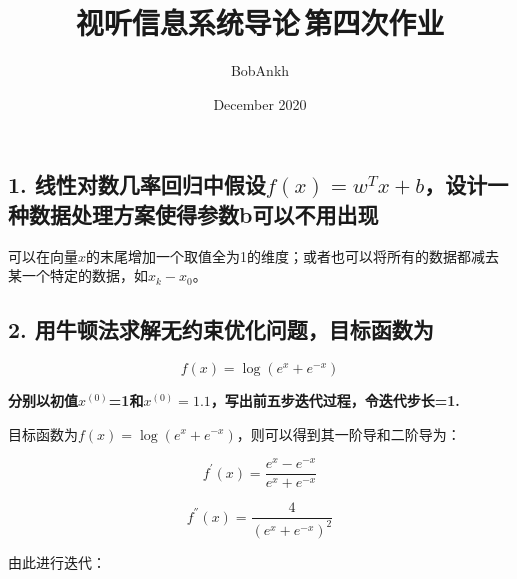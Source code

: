 \documentclass[]{article}
\title{视听信息系统导论\,第四次作业}
\author{BobAnkh}
\date{December 2020}
\begin{document}
\maketitle

\hypertarget{header-n80}{%
\subsection{1. 线性对数几率回归中假设$f(x)=w^T x+b$，设计一种数据处理方案使得参数b可以不用出现}\label{header-n80}}

    可以在向量$x$的末尾增加一个取值全为1的维度；或者也可以将所有的数据都减去某一个特定的数据，如$x_k-x_0$。

\hypertarget{header-n87}{%
\subsection{2. 用牛顿法求解无约束优化问题，目标函数为}\label{header-n87}}
$$
f(x)=\log ⁡(e^x+e^{-x})
$$

\textbf{分别以初值$x^{(0)}$=1和$x^{(0)}=1.1$，写出前五步迭代过程，令迭代步长=1.}
    
    目标函数为$f(x)=\log(e^x+e^{-x})$，则可以得到其一阶导和二阶导为：
    
    $$
    f^{'}(x)=\frac{e^x-e^{-x}}{e^x+e^{-x}}
    $$
    
    $$
    f^{''}(x)=\frac{4}{(e^x+e^{-x})^2}
    $$
    
    
    由此进行迭代：
    
\end{document}

